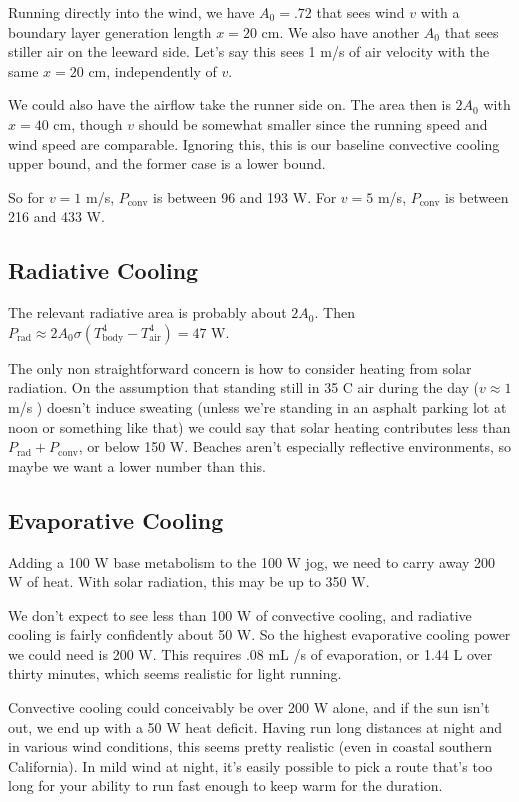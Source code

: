 \documentclass[12pt]{article}
\begin{document}
Running directly into the wind, we have \(A_0 = .72\) \msq that sees wind \(v\) with a boundary layer generation length \(x = 20\) cm. We also have another \(A_0\) that sees stiller air on the leeward side. Let's say this sees 1 m/s of air velocity with the same \(x=20\) cm, independently of \(v\).

We could also have the airflow take the runner side on. The area then is \(2A_0\) with \(x=40\) cm, though \(v\) should be somewhat smaller since the running speed and wind speed are comparable. Ignoring this, this is our baseline convective cooling upper bound, and the former case is a lower bound.

So for \(v=1\) m/s, \(P_{\mathrm{conv}}\) is between 96 and 193 W. For \(v=5\) m/s,  \(P_{\mathrm{conv}}\) is between 216 and 433 W.

\subsection{Radiative Cooling}

The relevant radiative area is probably about \(2A_0\). Then \(P_{\mathrm{rad}} \approx 2A_0\sigma(T_{\mathrm{body}}^4 - T_{\mathrm{air}}^4) = 47\) W.

The only non straightforward concern is how to consider heating from solar radiation. On the assumption that standing still in 35 C air during the day (\(v\approx 1\) m/s ) doesn't induce sweating (unless we're standing in an asphalt parking lot at noon or something like that) we could say that solar heating contributes less than \(P_{\mathrm{rad}} + P_{\mathrm{conv}}\), or below 150 W. Beaches aren't especially reflective environments, so maybe we want a lower number than this.

\subsection{Evaporative Cooling}

Adding a 100 W base metabolism to the 100 W jog, we need to carry away 200 W of heat. With solar radiation, this may be up to 350 W.

We don't expect to see less than 100 W of convective cooling, and radiative cooling is fairly confidently about 50 W. So the highest evaporative cooling power we could need is 200 W. This requires .08 mL /s of evaporation, or 1.44 L over thirty minutes, which seems realistic for light running.

Convective cooling could conceivably be over 200 W alone, and if the sun isn't out, we end up with a 50 W heat deficit. Having run long distances at night and in various wind conditions, this seems pretty realistic (even in coastal southern California). In mild wind at night, it's easily possible to pick a route that's too long for your ability to run fast enough to keep warm for the duration.
\end{document}
